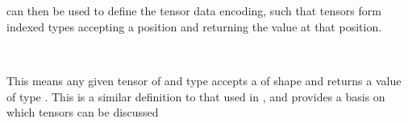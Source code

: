 \begin{AgdaAlign}
\begin{code}%
%
\>[2]\AgdaSpace{}%
\AgdaSpace{}%
\AgdaSymbol{:}\AgdaSpace{}%
\AgdaSpace{}%
\AgdaSpace{}%
\AgdaSpace{}%
\<%
\\
\>[2][@{}l@{\AgdaIndent{0}}]%
\>[4]%
\>[8]\AgdaSymbol{:}\AgdaSpace{}%
\AgdaSpace{}%
\AgdaSpace{}%
\AgdaSpace{}%
\AgdaSpace{}%
\AgdaSymbol{(}\AgdaSpace{}%
\AgdaSymbol{)}\<%
\\
%
\>[4]\AgdaSpace{}%
\AgdaSymbol{:}\AgdaSpace{}%
\AgdaSpace{}%
\AgdaSpace{}%
\AgdaSpace{}%
\AgdaSpace{}%
\AgdaSpace{}%
\AgdaSpace{}%
\AgdaSpace{}%
\AgdaSymbol{(}\AgdaSpace{}%
\AgdaSpace{}%
\AgdaSymbol{)}\<%
\end{code}

 can then be used to define the tensor data encoding, such that
tensors form indexed types
accepting a position and returning the value at that position.

\begin{code}%
%
\>[2]\AgdaSpace{}%
\AgdaSymbol{:}\AgdaSpace{}%
\AgdaSpace{}%
\AgdaSpace{}%
\AgdaSpace{}%
\AgdaSpace{}%
\<%
\\
%
\>[2]\AgdaSpace{}%
\AgdaSpace{}%
\AgdaSpace{}%
\AgdaSymbol{=}\AgdaSpace{}%
\AgdaSpace{}%
\AgdaSpace{}%
\AgdaSpace{}%
\<%
\end{code}
This means any given tensor of   and type  accepts a
 of shape  and returns a value of type .
This is a similar definition to that used in \cite{BlockedSinkarovs}, and
provides a basis on which tensors can be discussed
\end{AgdaAlign}
